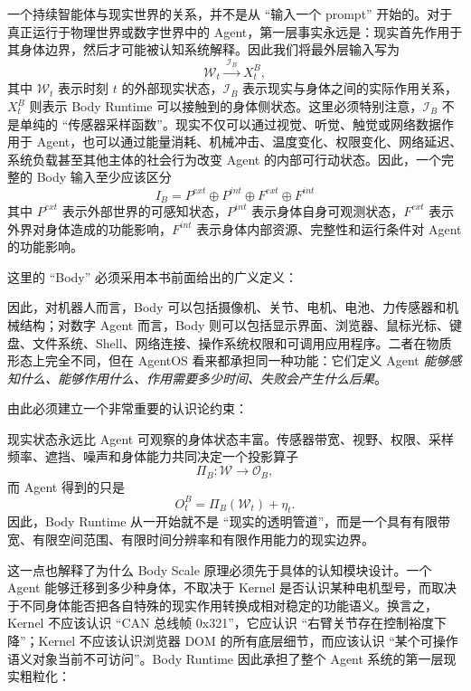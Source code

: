 一个持续智能体与现实世界的关系，并不是从 ``输入一个 prompt'' 开始的。对于真正运行于物理世界或数字世界中的 Agent，第一层事实永远是：现实首先作用于其身体边界，然后才可能被认知系统解释。因此我们将最外层输入写为
\[
\mathcal W_t
\xrightarrow{\;\mathcal I_B\;}
X^B_t ,
\]
其中 $\mathcal W_t$ 表示时刻 $t$ 的外部现实状态，$\mathcal I_B$ 表示现实与身体之间的实际作用关系，$X^B_t$ 则表示 Body Runtime 可以接触到的身体侧状态。这里必须特别注意，$\mathcal I_B$ 不是单纯的 ``传感器采样函数''。现实不仅可以通过视觉、听觉、触觉或网络数据作用于 Agent，也可以通过能量消耗、机械冲击、温度变化、权限变化、网络延迟、系统负载甚至其他主体的社会行为改变 Agent 的内部可行动状态。因此，一个完整的 Body 输入至少应该区分
\[
\boxed{
I_B
=
P^{ext}
\oplus
P^{int}
\oplus
F^{ext}
\oplus
F^{int}
}
\]
其中 $P^{ext}$ 表示外部世界的可感知状态，$P^{int}$ 表示身体自身可观测状态，$F^{ext}$ 表示外界对身体造成的功能影响，$F^{int}$ 表示身体内部资源、完整性和运行条件对 Agent 的功能影响。

这里的 ``Body'' 必须采用本书前面给出的广义定义：
\begin{statementbox}
\centering
{}
\end{statementbox}
因此，对机器人而言，Body 可以包括摄像机、关节、电机、电池、力传感器和机械结构；对数字 Agent 而言，Body 则可以包括显示界面、浏览器、鼠标光标、键盘、文件系统、Shell、网络连接、操作系统权限和可调用应用程序。二者在物质形态上完全不同，但在 AgentOS 看来都承担同一种功能：它们定义 Agent \emph{能够感知什么、能够作用什么、作用需要多少时间、失败会产生什么后果}。

由此必须建立一个非常重要的认识论约束：
\begin{statementbox}
\centering
{}
\end{statementbox}
现实状态永远比 Agent 可观察的身体状态丰富。传感器带宽、视野、权限、采样频率、遮挡、噪声和身体能力共同决定一个投影算子
\[
\Pi_B:\mathcal W\rightarrow\mathcal O_B ,
\]
而 Agent 得到的只是
\[
O^B_t=\Pi_B(\mathcal W_t)+\eta_t .
\]
因此，Body Runtime 从一开始就不是 ``现实的透明管道''，而是一个具有有限带宽、有限空间范围、有限时间分辨率和有限作用能力的现实边界。

这一点也解释了为什么 Body Scale 原理必须先于具体的认知模块设计。一个 Agent 能够迁移到多少种身体，不取决于 Kernel 是否认识某种电机型号，而取决于不同身体能否把各自特殊的现实作用转换成相对稳定的功能语义。换言之，Kernel 不应该认识 ``CAN 总线帧 0x321''，它应认识 ``右臂关节存在控制裕度下降''；Kernel 不应该认识浏览器 DOM 的所有底层细节，而应该认识 ``某个可操作语义对象当前不可访问''。Body Runtime 因此承担了整个 Agent 系统的第一层现实粗粒化：
\begin{statementbox}
\centering
{}
\end{statementbox}

